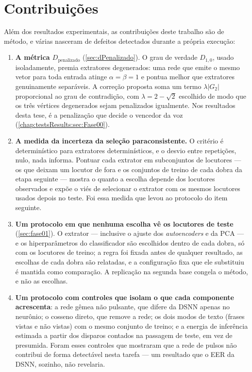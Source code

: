 	\section{Contribuições}

		\par Além dos resultados experimentais, as contribuições deste trabalho
		são de método, e várias nasceram de defeitos detectados durante a
		própria execução:

		\begin{enumerate}
			\item \textbf{A métrica $D_{\text{penalizado}}$}
			(\autoref{sec:dPenalizado}). O grau de verdade $D_{1,0}$, usado
			isoladamente, premia extratores degenerados: uma rede que emite o mesmo
			vetor para toda entrada atinge $\alpha=\beta=1$ e pontua melhor que
			extratores genuinamente separáveis. A correção proposta soma um termo
			$\lambda|G_2|$ proporcional ao grau de contradição, com
			$\lambda = 2-\sqrt{2}$ escolhido de modo que os três vértices
			degenerados sejam penalizados igualmente. Nos resultados desta tese, é
			a penalização que decide o vencedor da voz
			(\autoref{chap:testsResults:sec:Fase00}).

			\item \textbf{A medida da incerteza da seleção paraconsistente.} O
			critério é determinístico para extratores determinísticos, e o desvio
			entre repetições, nulo, nada informa. Pontuar cada extrator em
			subconjuntos de locutores --- os que deixam um locutor de fora e os
			conjuntos de treino de cada dobra da etapa seguinte --- mostra o quanto
			a escolha depende dos locutores observados e expõe o viés de selecionar
			o extrator com os mesmos locutores usados depois no teste. Foi essa
			medida que levou ao protocolo do item seguinte.

			\item \textbf{Um protocolo em que nenhuma escolha vê os locutores de
			teste} (\autoref{sec:fase01}). O extrator --- inclusive o ajuste dos
			\textit{autoencoders} e da \ac{PCA} --- e os hiperparâmetros do
			classificador são escolhidos dentro de cada dobra, só com os locutores
			de treino; a regra foi fixada antes de qualquer resultado, as escolhas
			de cada dobra são relatadas, e a configuração fixa que ele substituiu é
			mantida como comparação. A replicação na segunda base congela o método,
			e não as escolhas.

			\item \textbf{Um protocolo com controles que isolam o que cada
			componente acrescenta}: a rede gêmea não pulsante, que difere da
			\ac{DSNN} apenas no neurônio; o cosseno direto, que remove a rede; os
			dois modos de texto (frases vistas e não vistas) com o mesmo conjunto de treino; e a energia de
			inferência estimada a partir dos disparos contados na passagem de
			teste, em vez de presumida. Foram esses
			controles que mostraram que a rede de pulsos não contribui de forma
			detectável nesta tarefa --- um resultado que o \ac{EER} da \ac{DSNN},
			sozinho, não revelaria.


\end{enumerate}
